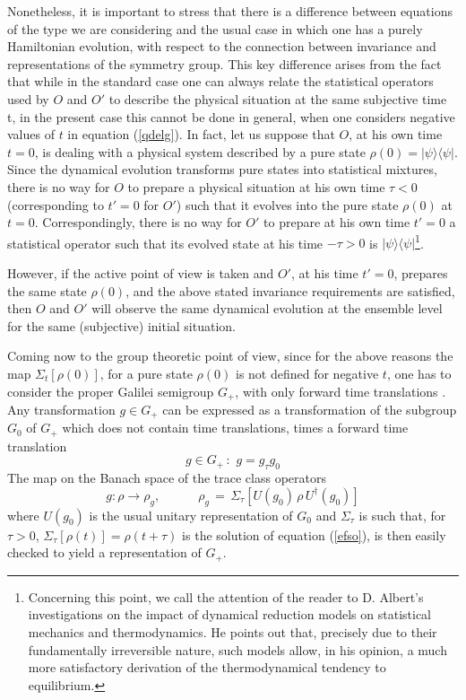 \documentclass[12pt]{article}
\begin{document}
Nonetheless, it is important to stress that there is a difference
between equations of the type we are considering and the usual
case in which one has a purely Hamiltonian evolution, with respect
to the connection between invariance and representations of the
symmetry group. This key difference arises from the fact that
while in the standard case one can always relate the statistical
operators used by $O$ and $O'$ to describe the physical situation
at the same subjective time t, in the present case this cannot be
done in general, when one considers negative values of $t$ in
equation (\ref{qdelg}). In fact, let us suppose that $O$, at his
own time $t = 0$, is dealing with a physical system described by a
pure state $\rho(0) = |\psi\rangle \langle\psi|$. Since the
dynamical evolution transforms pure states into statistical
mixtures, there is no way for $O$ to prepare a physical situation
at his own time $\tau < 0$ (corresponding to $t'=0$ for $O'$) such
that it evolves into the pure state $\rho(0)$ at $t = 0$.
Correspondingly, there is no way for $O'$ to prepare at his own
time $t' = 0$ a statistical operator such that its evolved state
at his time $- \tau > 0$ is $|\psi\rangle
\langle\psi|$\footnote{Concerning this point, we call the
attention of the reader to D. Albert's investigations \cite{alrd2}
on the impact of dynamical reduction models on statistical
mechanics and thermodynamics. He points out that, precisely due to
their fundamentally irreversible nature, such models allow, in his
opinion, a much more satisfactory derivation of the thermodynamical
tendency to equilibrium.}.

However, if the active point of view is taken and $O'$, at his
time $t' = 0$, prepares the same state $\rho(0)$, and the above
stated invariance requirements are satisfied, then $O$ and $O'$
will observe the same dynamical evolution at the ensemble level
for the same (subjective) initial situation.

Coming now to the group theoretic point of view, since for the
above reasons the map $\Sigma_{t}[\rho(0)]$, for a pure state
$\rho(0)$ is not defined for negative $t$, one has to consider the
proper Galilei semigroup $G_{+}$, with only forward time
translations \cite{grwctm}. Any transformation $g \in G_{+}$ can
be expressed as a transformation of the subgroup $G_{0}$ of
$G_{+}$ which does not contain time translations, times a forward
time translation
\begin{equation}
g \in G_{+}\,:\,\, g = g_{\tau}g_{0}
\end{equation}
The map on the Banach space of the trace class operators
\begin{equation}
g : \rho \longrightarrow \rho_{g}, \qquad\quad \rho_{g} \, = \,
\Sigma_{\tau}[U(g_{0})\, \rho\, U^{\dagger}(g_{0})]
\end{equation}
where $U(g_{0})$ is the usual unitary representation of $G_{0}$
and $\Sigma_{\tau}$ is such that, for $\tau > 0$,
$\Sigma_{\tau}[\rho(t)] = \rho(t+\tau)$ is the solution of
equation (\ref{efso}), is then easily checked to yield a
representation of $G_{+}$.
\end{document}
